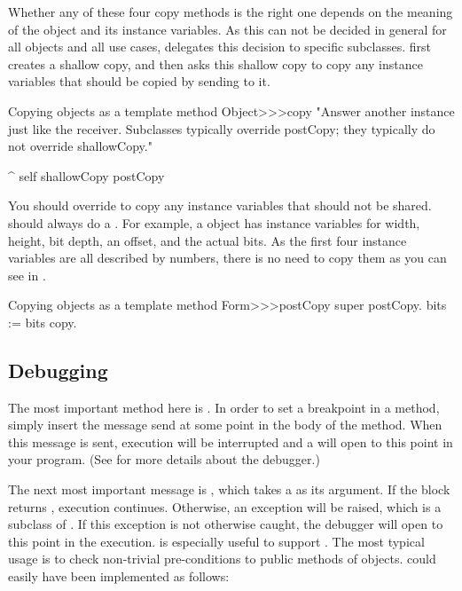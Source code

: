\documentclass[a4paper,10pt,twoside]{book}
\begin{document}
Whether any of these four copy methods is the right one depends on the meaning of the object and its instance variables. 
As this can not be decided in general for all objects and all use cases,  delegates this decision to specific subclasses. 
 first creates a shallow copy, and then asks this shallow copy to copy any instance variables that should be copied by sending  to it.

\begin{method}{Copying objects as a template method}
Object>>>copy
    "Answer another instance just like the receiver. Subclasses typically override postCopy; they typically do not override shallowCopy."

    ^ self shallowCopy postCopy
\end{method}

You should override  to copy any instance variables that should not be shared.
 should always do a . 
For example, a  object has instance variables for width, height, bit depth, an offset, and the actual bits. 
As the first four instance variables are all described by numbers, there is no need to copy them as you can see in .

\begin{method}{Copying objects as a template method}
Form>>>postCopy
    super postCopy.
    bits := bits copy.
\end{method}



\subsection{Debugging}

The most important method here is .
In order to set a breakpoint in a method, simply insert the message send  at some point in the body of the method.
When this message is sent, execution will be interrupted and a  will open to this point in your program.
(See  for more details about the debugger.)


The next most important message is , which takes a  as its argument.
If the block returns , execution continues.
Otherwise, an  exception will be raised, which is a subclass of .
If this exception is not otherwise caught, the debugger will open to this point in the execution.
 is especially useful to support .
The most typical usage is to check non-trivial pre-conditions to public methods of objects.
 could easily have been implemented as follows:
\end{document}
